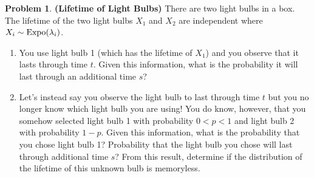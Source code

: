 \documentclass[11pt]{article}
\theoremstyle{definition}
\newtheorem{prob}[theo]{\color{Maroon} Problem}
\theoremstyle{remark}
\newcommand{\Expo}{\textnormal{Expo}}
\begin{document}
\pagebreak

\begin{prob} \textbf{(Lifetime of Light Bulbs)}
There are two light bulbs in a box. The lifetime of the two light bulbs $X_1$ and $X_2$ are independent where $X_i \sim \Expo(\lambda_i)$.

\begin{enumerate}[label = (\alph*)] 
	\item You use light bulb 1 (which has the lifetime of $X_1$) and you observe that it lasts through  time $t$. Given this information, what is the probability it will last through an additional time $s$?
	
	
	
	\item Let's instead say you observe the light bulb to last through time $t$ but you no longer know which light bulb you are using! You do know, however, that you somehow selected light bulb 1 with probability $0<p<1$ and light bulb 2 with probability $1-p$. Given this information, what is the probability that you chose light bulb 1? Probability that the light bulb you chose will last through additional time $s$? From this result, determine if the distribution of the lifetime of this unknown bulb is memoryless.

	
	
\end{enumerate}
\end{prob} 
\end{document}
